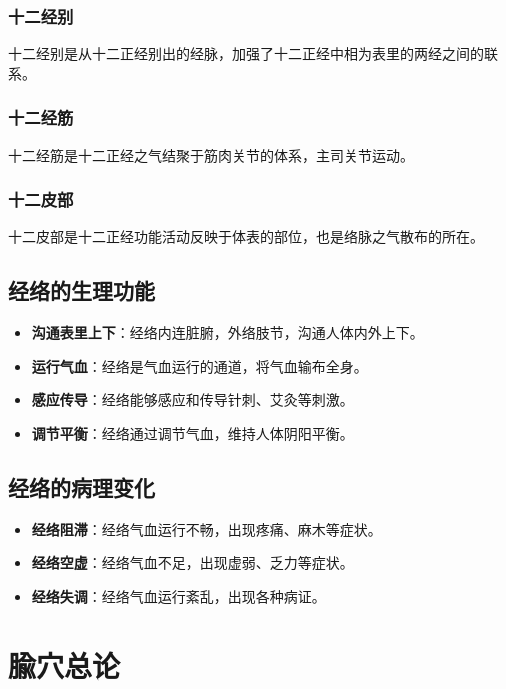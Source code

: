 \documentclass[12pt,UTF8]{ctexbook}
\begin{document}
\subsubsection{十二经别}

十二经别是从十二正经别出的经脉，加强了十二正经中相为表里的两经之间的联系。

\subsubsection{十二经筋}

十二经筋是十二正经之气结聚于筋肉关节的体系，主司关节运动。

\subsubsection{十二皮部}

十二皮部是十二正经功能活动反映于体表的部位，也是络脉之气散布的所在。

\subsection{经络的生理功能}

\begin{itemize}
\item \textbf{沟通表里上下}：经络内连脏腑，外络肢节，沟通人体内外上下。
\item \textbf{运行气血}：经络是气血运行的通道，将气血输布全身。
\item \textbf{感应传导}：经络能够感应和传导针刺、艾灸等刺激。
\item \textbf{调节平衡}：经络通过调节气血，维持人体阴阳平衡。
\end{itemize}

\subsection{经络的病理变化}

\begin{itemize}
\item \textbf{经络阻滞}：经络气血运行不畅，出现疼痛、麻木等症状。
\item \textbf{经络空虚}：经络气血不足，出现虚弱、乏力等症状。
\item \textbf{经络失调}：经络气血运行紊乱，出现各种病证。
\end{itemize}

\section{腧穴总论}
\end{document}
